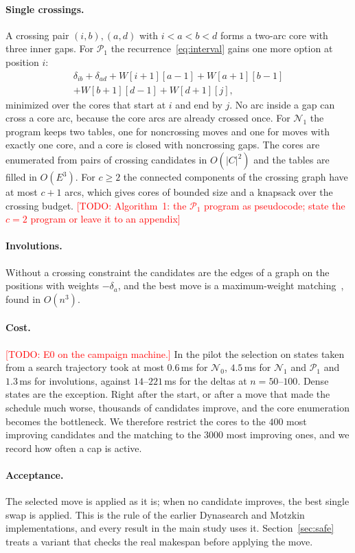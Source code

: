 \documentclass{article}
\newcommand{\todo}[1]{\textcolor{red}{[TODO: #1]}}
\newcommand{\N}{\mathcal{N}}
\newcommand{\Pa}{\mathcal{P}}
\begin{document}
\paragraph{Single crossings.} A crossing pair $(i,b),(a,d)$ with
$i<a<b<d$ forms a two-arc core with three inner gaps. For $\Pa_1$ the
recurrence~\eqref{eq:interval} gains one more option at position $i$:
\begin{multline}
\delta_{ib}+\delta_{ad}+W[i{+}1][a{-}1]+W[a{+}1][b{-}1]\\
+W[b{+}1][d{-}1]+W[d{+}1][j],
\end{multline}
minimized over the cores that start at $i$ and end by $j$. No arc inside
a gap can cross a core arc, because the core arcs are already crossed
once. For $\N_1$ the program keeps two tables, one for noncrossing moves
and one for moves with exactly one core, and a core is closed with
noncrossing gaps. The cores are enumerated from pairs of crossing
candidates in $O(|C|^2)$ and the tables are filled in $O(E^3)$. For
$c\geq2$ the connected components of the crossing graph have at most
$c+1$ arcs, which gives cores of bounded size and a knapsack over the
crossing budget. \todo{Algorithm~1: the $\Pa_1$ program as pseudocode;
state the $c=2$ program or leave it to an appendix}

\paragraph{Involutions.} Without a crossing constraint the candidates
are the edges of a graph on the positions with weights $-\delta_a$, and
the best move is a maximum-weight matching~\cite{edmonds1965}, found in
$O(n^3)$.

\paragraph{Cost.} \todo{E0 on the campaign machine.} In the pilot the
selection on states taken from a search trajectory took at most
$0.6$\,ms for $\N_0$, $4.5$\,ms for $\N_1$ and $\Pa_1$ and $1.3$\,ms for
involutions, against $14$--$221$\,ms for the deltas at $n=50$--$100$.
Dense states are the exception. Right after the start, or after a move
that made the schedule much worse, thousands of candidates improve, and
the core enumeration becomes the bottleneck. We therefore restrict the
cores to the $400$ most improving candidates and the matching to the
$3000$ most improving ones, and we record how often a cap is active.

\paragraph{Acceptance.} The selected move is applied as it is; when no
candidate improves, the best single swap is applied. This is the rule of
the earlier Dynasearch and Motzkin implementations, and every result in
the main study uses it. Section~\ref{sec:safe} treats a variant that
checks the real makespan before applying the move.
\end{document}
